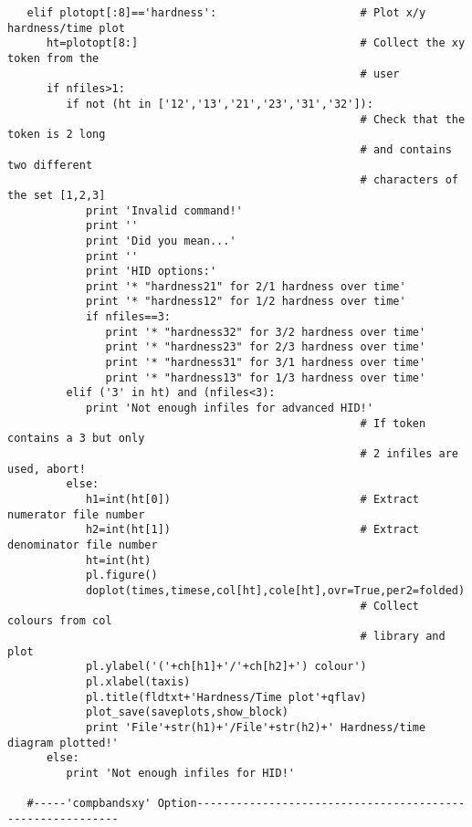 \begin{verbatim}
   elif plotopt[:8]=='hardness':                      # Plot x/y hardness/time plot
      ht=plotopt[8:]                                  # Collect the xy token from the
                                                      # user
      if nfiles>1:
         if not (ht in ['12','13','21','23','31','32']):
                                                      # Check that the token is 2 long
                                                      # and contains two different
                                                      # characters of the set [1,2,3]
            print 'Invalid command!'
            print ''
            print 'Did you mean...'
            print ''
            print 'HID options:'
            print '* "hardness21" for 2/1 hardness over time'
            print '* "hardness12" for 1/2 hardness over time'
            if nfiles==3:
               print '* "hardness32" for 3/2 hardness over time'
               print '* "hardness23" for 2/3 hardness over time'
               print '* "hardness31" for 3/1 hardness over time'
               print '* "hardness13" for 1/3 hardness over time'
         elif ('3' in ht) and (nfiles<3):
            print 'Not enough infiles for advanced HID!'
                                                      # If token contains a 3 but only
                                                      # 2 infiles are used, abort!
         else:
            h1=int(ht[0])                             # Extract numerator file number
            h2=int(ht[1])                             # Extract denominator file number
            ht=int(ht)
            pl.figure()
            doplot(times,timese,col[ht],cole[ht],ovr=True,per2=folded)
                                                      # Collect colours from col
                                                      # library and plot
            pl.ylabel('('+ch[h1]+'/'+ch[h2]+') colour')
            pl.xlabel(taxis)
            pl.title(fldtxt+'Hardness/Time plot'+qflav)
            plot_save(saveplots,show_block)
            print 'File'+str(h1)+'/File'+str(h2)+' Hardness/time diagram plotted!'
      else:
         print 'Not enough infiles for HID!'

   #-----'compbandsxy' Option----------------------------------------------------------


\end{verbatim}
